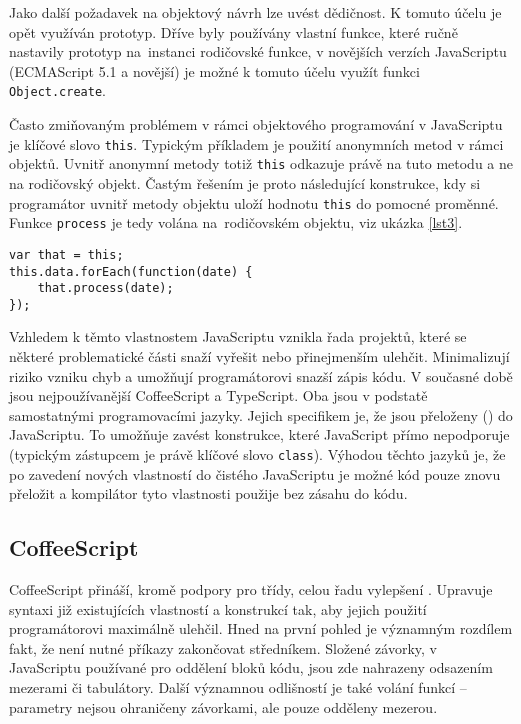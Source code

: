Jako další požadavek na objektový návrh lze uvést dědičnost. K tomuto účelu je opět využíván prototyp. Dříve byly používány vlastní funkce, které ručně nastavily prototyp na~instanci rodičovské funkce, v novějších verzích JavaScriptu (ECMAScript 5.1 a novější) je možné k tomuto účelu využít funkci \texttt{Object.create}.

Často zmiňovaným problémem v rámci objektového programování v JavaScriptu je klíčové slovo \texttt{this}. Typickým příkladem je použití anonymních metod v rámci objektů. Uvnitř anonymní metody totiž \texttt{this} odkazuje právě na tuto metodu a ne na rodičovský objekt. Častým řešením je proto následující konstrukce, kdy si programátor uvnitř metody objektu uloží hodnotu \texttt{this} do pomocné proměnné. Funkce \texttt{process} je tedy volána na~rodičovském objektu, viz ukázka \ref{lst3}.

\begin{lstlisting}[caption={Nutnost ukládání proměnné this},label=lst3]
var that = this;
this.data.forEach(function(date) {
	that.process(date);
});
\end{lstlisting}

Vzhledem k těmto vlastnostem JavaScriptu vznikla řada projektů, které se některé problematické části snaží vyřešit nebo přinejmenším ulehčit. Minimalizují riziko vzniku chyb a umožňují programátorovi snazší zápis kódu. V současné době jsou nejpoužívanější CoffeeScript a TypeScript. Oba jsou v podstatě samostatnými programovacími jazyky. Jejich specifikem je, že jsou přeloženy () do JavaScriptu. To umožňuje zavést konstrukce, které JavaScript přímo nepodporuje (typickým zástupcem je právě klíčové slovo \texttt{class}). Výhodou těchto jazyků je, že po zavedení nových vlastností do čistého JavaScriptu je možné kód pouze znovu přeložit a kompilátor tyto vlastnosti použije bez zásahu do kódu.

\subsection{CoffeeScript}
CoffeeScript přináší, kromě podpory pro třídy, celou řadu vylepšení \cite{coffeescript}. Upravuje syntaxi již existujících vlastností a konstrukcí tak, aby jejich použití programátorovi maximálně ulehčil. Hned na první pohled je významným rozdílem fakt, že není nutné příkazy zakončovat středníkem. Složené závorky, v JavaScriptu používané pro oddělení bloků kódu, jsou zde nahrazeny odsazením mezerami či tabulátory. Další významnou odlišností je také volání funkcí -- parametry nejsou ohraničeny závorkami, ale pouze odděleny mezerou.

